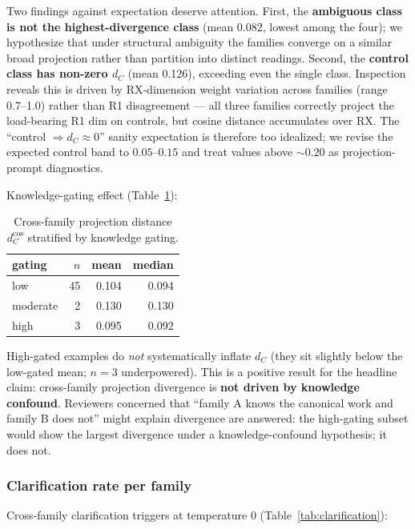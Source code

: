 Two findings against expectation deserve attention. First, the \textbf{ambiguous class is not the highest-divergence class} (mean 0.082, lowest among the four); we hypothesize that under structural ambiguity the families converge on a similar broad projection rather than partition into distinct readings. Second, the \textbf{control class has non-zero $d_C$} (mean 0.126), exceeding even the single class. Inspection reveals this is driven by RX-dimension weight variation across families (range 0.7--1.0) rather than R1 disagreement --- all three families correctly project the load-bearing R1 dim on controls, but cosine distance accumulates over RX. The ``control $\Rightarrow d_C \approx 0$'' sanity expectation is therefore too idealized; we revise the expected control band to $0.05$--$0.15$ and treat values above $\sim 0.20$ as projection-prompt diagnostics.

Knowledge-gating effect (Table~\ref{tab:dc_by_gating}):

\begin{table}[t]
\centering
\caption{Cross-family projection distance $d_C^{\cos}$ stratified by knowledge gating.}
\label{tab:dc_by_gating}
\begin{tabular}{lrrr}
\toprule
\textbf{gating} & $n$ & \textbf{mean} & \textbf{median} \\
\midrule
low      & 45 & 0.104 & 0.094 \\
moderate &  2 & 0.130 & 0.130 \\
high     &  3 & 0.095 & 0.092 \\
\bottomrule
\end{tabular}
\end{table}

High-gated examples do \emph{not} systematically inflate $d_C$ (they sit slightly below the low-gated mean; $n = 3$ underpowered). This is a positive result for the headline claim: cross-family projection divergence is \textbf{not driven by knowledge confound}. Reviewers concerned that ``family A knows the canonical work and family B does not'' might explain divergence are answered: the high-gating subset would show the largest divergence under a knowledge-confound hypothesis; it does not.

\subsubsection{Clarification rate per family}
\label{sec:results:exp1:clarification}

Cross-family clarification triggers at temperature 0 (Table~\ref{tab:clarification}):

